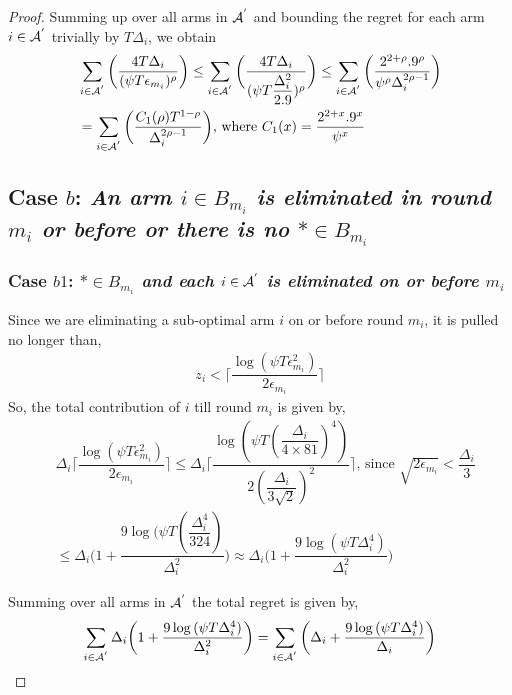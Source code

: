 \begin{proof}
Summing up over all arms in $\mathcal{A}^{'}$ and bounding the regret for each arm $i\in \mathcal{A}^{'}$ trivially by $T\Delta_{i}$, we obtain
   \begin{align*}
&\sum_{i\in \mathcal{A}^{'}}\bigg(\dfrac{4T\Delta_{i}}{(\psi T\epsilon_{m_{i}})^{\rho}}\bigg)
\leq\sum_{i\in \mathcal{A}^{'}}\bigg(\dfrac{4T\Delta_{i}}{(\psi T\dfrac{\Delta_{i}^{2}}{2.9})^{\rho}}\bigg)
\leq \sum_{i\in \mathcal{A}^{'}}\bigg(\dfrac{2^{2+\rho}.9^{\rho}}{\psi^{\rho}\Delta_{i}^{2\rho -1}}\bigg)\\   
& =\sum_{i\in \mathcal{A}^{'}}\bigg(\dfrac{C_{1}(\rho)T^{1-\rho}}{\Delta_{i}^{2\rho -1}}\bigg) \text{, where } C_1(x) = \frac{2^{2+x}.9^{x}}{\psi^{x}}
   \end{align*}

\subsection*{Case $b$: \textit{An arm ${i}\in B_{m_i}$ is eliminated in round $m_{i}$ or before or there is no $*\in B_{m_i}$}}

\subsubsection*{Case $b1$: \textit{${*}\in B_{m_{i}}$ and each ${i}\in \mathcal{A}^{'}$ is  eliminated on or before $m_{i}$ } }

Since we are eliminating a sub-optimal arm ${i}$ on or before round $m_{i}$, it is pulled no longer than, 
 \begin{align*}
 z_{i} < \bigg\lceil\dfrac{\log{(\psi T\epsilon_{m_{i}}^{2})}}{2\epsilon_{m_{i}}}\bigg\rceil
 \end{align*}
So, the total contribution of ${i}$  till round $m_{i}$ is given by, 
\begin{align*}
&\Delta_{i}\bigg\lceil\dfrac{\log{(\psi T\epsilon_{m_{i}}^{2})}}{2\epsilon_{m_{i}}}\bigg\rceil
\leq\Delta_{i}\bigg\lceil\dfrac{\log{(\psi T(\dfrac{\Delta_{i}}{4 \times 81})^{4})}}{2(\dfrac{\Delta_{i}}{3\sqrt{2}})^{2}}\bigg\rceil \text{, since } \sqrt{2\epsilon_{m_{i}}} < \dfrac{\Delta_{i}}{3}\\
&\leq\Delta_{i}\bigg(1+\dfrac{9\log{(\psi T(\dfrac{\Delta_{i}^{4}}{324})}}{\Delta_{i}^{2}}\bigg)
\approx\Delta_{i}\bigg(1+\dfrac{9\log{(\psi T\Delta_{i}^{4})}}{\Delta_{i}^{2}}\bigg)
\end{align*} 
 
Summing over all arms in $\mathcal{A}^{'}$ the total regret is given by, 
\begin{align*}
\sum_{i\in \mathcal{A}^{'}}\Delta_{i}\bigg(1+\dfrac{9\log{(\psi T\Delta_{i}^{4}})}{\Delta_{i}^{2}}\bigg) = \sum_{i\in \mathcal{A}^{'}}\bigg(\Delta_{i} +\dfrac{9\log{(\psi T\Delta_{i}^{4}})}{\Delta_{i}}\bigg)
\end{align*}


\end{proof}
